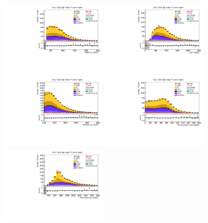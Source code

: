 \begin{figure}[tbp]
  \begin{center}
    \includegraphics[width=0.48\textwidth]{figures/wlnhbb2016/resolved/WenWHHeavyFlavorCRHighMass_lepton1Pt.pdf}
    \includegraphics[width=0.48\textwidth]{figures/wlnhbb2016/resolved/WenWHHeavyFlavorCRHighMass_pfmet.pdf}
    \includegraphics[width=0.48\textwidth]{figures/wlnhbb2016/resolved/WenWHHeavyFlavorCRHighMass_WpT.pdf}
    \includegraphics[width=0.48\textwidth]{figures/wlnhbb2016/resolved/WenWHHeavyFlavorCRHighMass_mTW.pdf}
    \includegraphics[width=0.48\textwidth]{figures/wlnhbb2016/resolved/WenWHHeavyFlavorCRHighMass_topMassLep1Met.pdf}

\end{center}
\end{figure}

